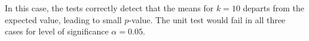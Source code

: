 In this case, the tests correctly detect that the means for $k=10$ departs from
the expected value, leading to small $p$-value.  The unit test would fail
in all three cases for level of significance $\alpha=0.05$.


